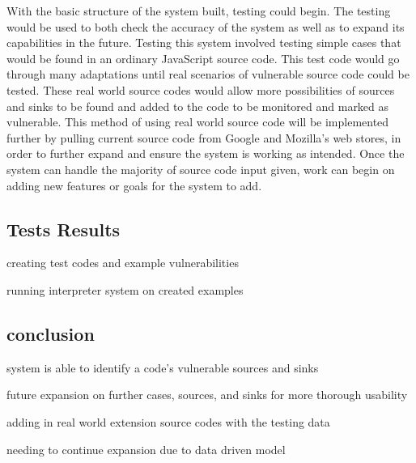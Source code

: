 \documentclass[jou,apacite]{apa6}
\begin{document}
	With the basic structure of the system built, testing could begin. The testing would be used to both check the accuracy of the system as well as to expand its capabilities in the future. Testing this system involved testing simple cases that would be found in an ordinary JavaScript source code.  This test code would go through many adaptations until real scenarios of vulnerable source code could be tested.  These real world source codes would allow more possibilities of sources and sinks to be found and added to the code to be monitored and marked as vulnerable.  This method of using real world source code will be implemented further by pulling current source code from Google and Mozilla’s web stores, in order to further expand and ensure the system is working as intended. Once the system can handle the majority of source code input given, work can begin on adding new features or goals for the system to add.

	\subsection{Tests Results}

		creating test codes and example vulnerabilities

		running interpreter system on created examples

	\subsection{conclusion}

		system is able to identify a code's vulnerable sources and sinks
		
		future expansion on further cases, sources, and sinks for more thorough usability

		adding in real world extension source codes with the testing data		

		needing to continue expansion due to data driven model


\end{document}
